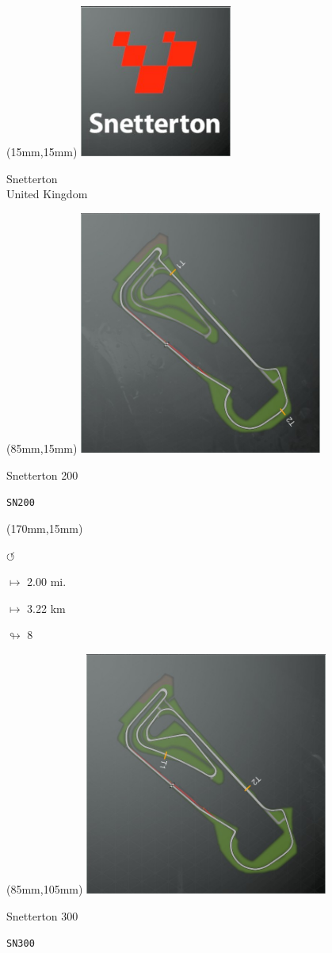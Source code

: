 \begin{textblock*}{60mm}(15mm,15mm)%
\includegraphics[width=50mm]{LG/2015-05-20_00095.png}
\par Snetterton\\ United Kingdom
\end{textblock*}
\begin{textblock*}{80mm}(85mm,15mm)%
\includegraphics[width=80mm]{TR/2015-05-20_00061.png}
\centerline{Snetterton 200}
\par\hfill\tiny\tt SN200\\
\end{textblock*}
\begin{textblock*}{30mm}(170mm,15mm)%
\par \Huge$\circlearrowleft$
\Large
\par$\mapsto$ 2.00 mi.
\par$\mapsto$ 3.22 km
\par$\looparrowright$ 8
\end{textblock*}
\begin{textblock*}{80mm}(85mm,105mm)%
\includegraphics[width=80mm]{TR/2015-05-20_00060.png}
\centerline{Snetterton 300}
\par\hfill\tiny\tt SN300\\
\end{textblock*}
